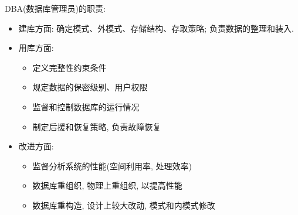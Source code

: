 DBA(数据库管理员)的职责:
\begin{itemize}
    \item 建库方面: 确定模式、外模式、存储结构、存取策略; 负责数据的整理和装入.
    \item 用库方面: 
    \begin{itemize}
        \item 定义完整性约束条件
        \item 规定数据的保密级别、用户权限
        \item 监督和控制数据库的运行情况
        \item 制定后援和恢复策略, 负责故障恢复
    \end{itemize}
    \item 改进方面:
    \begin{itemize}
        \item 监督分析系统的性能(空间利用率, 处理效率)
        \item 数据库重组织, 物理上重组织, 以提高性能
        \item 数据库重构造, 设计上较大改动, 模式和内模式修改
    \end{itemize}
\end{itemize}
